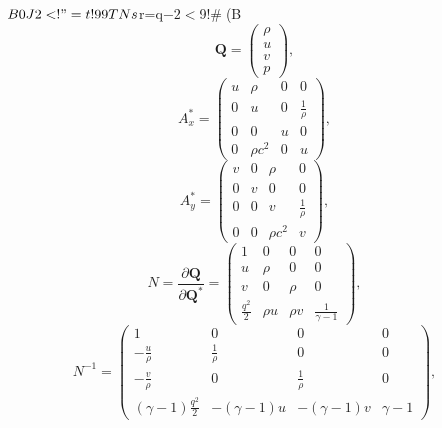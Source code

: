 $B0J2<!"=t!99TNs$r=q$-2<$9!#(B
\begin{equation}
 \bm{Q} =
  \begin{pmatrix}
   \rho \\ u \\ v \\ p
  \end{pmatrix},
\end{equation}
\begin{equation}
 A_x^*=
  \begin{pmatrix}
   u & \rho & 0 & 0 \\
   0 & u & 0 & \frac{1}{\rho}  \\
   0 & 0 & u & 0 \\
   0 & \rho c^2 & 0 & u
  \end{pmatrix},
\end{equation}
\begin{equation}
 A_y^* = 
  \begin{pmatrix}
   v & 0 & \rho & 0 \\
   0 & v & 0 & 0 \\
   0 & 0 & v & \frac{1}{\rho} \\ 
   0 & 0 & \rho c^2 &  v
  \end{pmatrix},
\end{equation}
\begin{equation}
 N = \frac{\partial\bm{Q}}{\partial\bm{Q}^*} =
  \begin{pmatrix}
   1 & 0 & 0 & 0 \\
   u & \rho & 0 & 0 \\ 
   v & 0 & \rho & 0 \\
   \frac{q^2}{2} & \rho u & \rho v & \frac{1}{\gamma - 1} 
  \end{pmatrix},
\end{equation}
\begin{equation}
 N^{-1} =
  \begin{pmatrix}
   1 & 0 & 0 & 0 \\
   -\frac{u}{\rho} & \frac{1}{\rho} & 0 & 0 \\ 
   -\frac{v}{\rho} & 0 & \frac{1}{\rho} & 0 \\ 
   (\gamma - 1)\frac{q^2}{2} & -(\gamma - 1) u & -(\gamma - 1) v &
   \gamma - 1 
  \end{pmatrix},
\end{equation}

